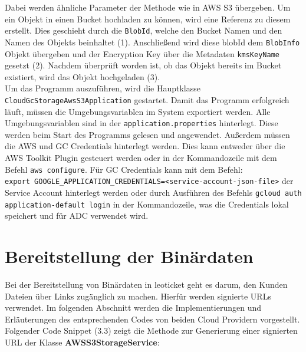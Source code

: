 Dabei werden ähnliche Parameter der Methode wie in AWS S3 übergeben. Um ein Objekt in einen Bucket hochladen zu können, wird eine Referenz zu diesem erstellt. Dies geschieht durch die \verb|BlobId|, welche den Bucket Namen und den Namen des Objekts beinhaltet (1). 
Anschließend wird diese blobId dem \verb|BlobInfo| Objekt übergeben und der  Encryption Key über die Metadaten \verb|kmsKeyName| gesetzt (2). Nachdem überprüft worden ist, ob das Objekt bereits im Bucket existiert, wird das Objekt hochgeladen (3).\\

Um das Programm auszuführen, wird die Hauptklasse \verb|CloudGcStorageAwsS3Application| gestartet. Damit das Programm erfolgreich läuft, müssen die Umgebungsvariablen im System exportiert werden. Alle Umgebungsvariablen sind in der \verb|application.properties| hinterlegt. Diese werden beim Start des Programms gelesen und angewendet. Außerdem müssen die AWS und GC Credentials hinterlegt werden. Dies kann entweder über die AWS Toolkit Plugin gesteuert werden oder in der Kommandozeile mit dem Befehl \verb|aws configure|. Für GC Credentials kann mit dem Befehl:\\ \verb|export GOOGLE_APPLICATION_CREDENTIALS=<service-account-json-file>| der Service Account hinterlegt werden oder durch Ausführen des Befehls \verb|gcloud auth application-default login| in der Kommandozeile, was die Credentials lokal speichert und für ADC verwendet wird.

\newpage

\section{Bereitstellung der Binärdaten}

Bei der Bereitstellung von Binärdaten in leoticket geht es darum, den Kunden Dateien über Links zugänglich zu machen. Hierfür werden signierte URLs verwendet. Im folgenden Abschnitt werden die Implementierungen und Erläuterungen des entsprechenden Codes von beiden Cloud Providern vorgestellt.\\

Folgender Code Snippet (3.3) zeigt die Methode zur Generierung einer signierten URL der Klasse \textbf{AWSS3StorageService}:

